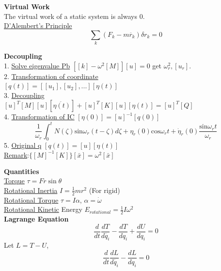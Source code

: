 \documentclass{article}
\begin{document}
\begin{multicols}{3}
\noindent\textbf{Virtual Work}\\
The virtual work of a static system is always 0.\\
\underline{D'Alembert's Principle}
\begin{equation*}
  \sum_k (F_k - m \ddot{r_k}) \delta r_k = 0
\end{equation*}

\noindent\textbf{Decoupling}\\
1. \underline{Solve eigenvalue Pb}
$[[k]-\omega^{2}[M]][u]=0$
get $\omega_{r}^{2},[u_{r}]$.\\
2. \underline{Transformation of coordinate}\\
$[q(t)]=[[u_{1}],[u_{2}],...][\eta(t)]$\\
3. \underline{Decoupling}\\
$[u]^{T}[M][u][\ddot{\eta(t)}]+[u]^{T}[K][u][\eta(t)]=[u]^{T}[Q]$\\
4. \underline{Transformation of IC} $[\eta(0)]=[u]^{-1}[q(0)]$
 $$
 \frac{1}{\omega_{r}}\int_{0}^{t}N(\zeta)\text{sin}\omega_{r}(t-\zeta)d\zeta+\eta_{r}(0)\text{cos}\omega_{r}t+\dot{\eta}_{r}(0)\frac{\text{sin}\omega_{r}t}{\omega_{r}}
 $$
5. \underline{Original q} $[q(t)]=[u][\eta(t)]$\\
\underline{Remark}:$\{[M]^{-1}[K]\}[\bar{x}]=\omega^{2}[\bar{x}]$

\noindent\textbf{Quantities}\\
\underline{Torque} $\tau = Fr \sin\theta$\\
\underline{Rotational Inertia} $I=\frac{1}{2}mr^2$ (For rigid)\\
\underline{Rotational Torque} $\tau = I\alpha$, $\alpha = \dot{\omega}$\\
\underline{Rotational Kinetic} Energy $E_{rotational}=\frac{1}{2}I\omega^2$\\

\noindent\textbf{Lagrange Equation}
\begin{equation*}
  \frac{d}{dt}\frac{dT}{d\dot{q_i}} - \frac{dT}{dq_i} + \frac{dU}{dq_i} = 0
\end{equation*}
Let $L = T - U$,
\begin{equation*}
  \frac{d}{dt}\frac{dL}{d\dot{q_i}} - \frac{dL}{dq_i} = 0
\end{equation*}


\end{multicols}
\end{document}
